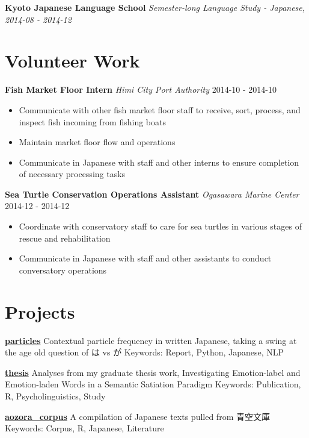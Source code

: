 \documentclass[a4paper,9pt]{extarticle}
\begin{document}
\noindent
\textbf{Kyoto Japanese Language School}
\textit{Semester-long Language Study - Japanese, 2014-08 - 2014-12}



\section*{Volunteer Work}

\noindent
\textbf{Fish Market Floor Intern}
\noindent
\textit{Himi City Port Authority} \hfill 2014-10 - 2014-10
\begin{itemize}

\item Communicate with other fish market floor staff to receive, sort, process, and inspect fish incoming from fishing boats
\item Maintain market floor flow and operations
\item Communicate in Japanese with staff and other interns to ensure completion of necessary processing tasks
\end{itemize}

\noindent
\textbf{Sea Turtle Conservation Operations Assistant}
\noindent
\textit{Ogasawara Marine Center} \hfill 2014-12 - 2014-12
\begin{itemize}

\item Coordinate with conservatory staff to care for sea turtles in various stages of rescue and rehabilitation
\item Communicate in Japanese with staff and other assistants to conduct conversatory operations
\end{itemize}



\section*{Projects}

\noindent
\textbf{\href{https://github.com/ryancahildebrandt/particles}{particles}}
Contextual particle frequency in written Japanese, taking a swing at the age old question of は vs が
Keywords: Report, Python, Japanese, NLP

\noindent
\textbf{\href{https://github.com/ryancahildebrandt/thesis}{thesis}}
Analyses from my graduate thesis work, Investigating Emotion-label and Emotion-laden Words in a Semantic Satiation Paradigm
Keywords: Publication, R, Psycholinguistics, Study

\noindent
\textbf{\href{https://github.com/ryancahildebrandt/aozora\_corpus}{aozora\_corpus}}
A compilation of Japanese texts pulled from 青空文庫
Keywords: Corpus, R, Japanese, Literature
\end{document}
